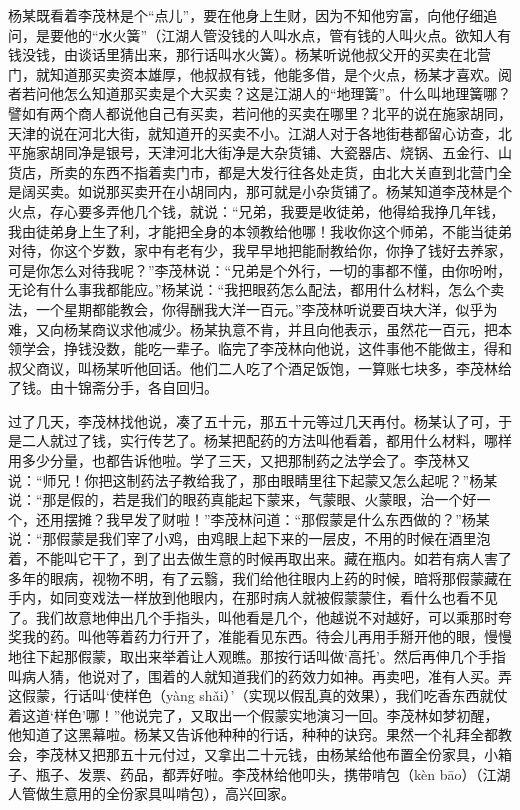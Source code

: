 \documentclass[12pt,UTF8]{ctexbook}
\begin{document}
杨某既看着李茂林是个“点儿”，要在他身上生财，因为不知他穷富，向他仔细追问，是要他的“水火簧”（江湖人管没钱的人叫水点，管有钱的人叫火点。欲知人有钱没钱，由谈话里猜出来，那行话叫水火簧）。杨某听说他叔父开的买卖在北营门，就知道那买卖资本雄厚，他叔叔有钱，他能多借，是个火点，杨某才喜欢。阅者若问他怎么知道那买卖是个大买卖？这是江湖人的“地理簧”。什么叫地理簧哪？譬如有两个商人都说他自己有买卖，若问他的买卖在哪里？北平的说在施家胡同，天津的说在河北大街，就知道开的买卖不小。江湖人对于各地街巷都留心访查，北平施家胡同净是银号，天津河北大街净是大杂货铺、大瓷器店、烧锅、五金行、山货店，所卖的东西不指着卖门市，都是大发行往各处走货，由北大关直到北营门全是阔买卖。如说那买卖开在小胡同内，那可就是小杂货铺了。杨某知道李茂林是个火点，存心要多弄他几个钱，就说：“兄弟，我要是收徒弟，他得给我挣几年钱，我由徒弟身上生了利，才能把全身的本领教给他哪！我收你这个师弟，不能当徒弟对待，你这个岁数，家中有老有少，我早早地把能耐教给你，你挣了钱好去养家，可是你怎么对待我呢？”李茂林说：“兄弟是个外行，一切的事都不懂，由你吩咐，无论有什么事我都能应。”杨某说：“我把眼药怎么配法，都用什么材料，怎么个卖法，一个星期都能教会，你得酬我大洋一百元。”李茂林听说要百块大洋，似乎为难，又向杨某商议求他减少。杨某执意不肯，并且向他表示，虽然花一百元，把本领学会，挣钱没数，能吃一辈子。临完了李茂林向他说，这件事他不能做主，得和叔父商议，叫杨某听他回话。他们二人吃了个酒足饭饱，一算账七块多，李茂林给了钱。由十锦斋分手，各自回归。

过了几天，李茂林找他说，凑了五十元，那五十元等过几天再付。杨某认了可，于是二人就过了钱，实行传艺了。杨某把配药的方法叫他看着，都用什么材料，哪样用多少分量，也都告诉他啦。学了三天，又把那制药之法学会了。李茂林又说：“师兄！你把这制药法子教给我了，那由眼睛里往下起蒙又怎么起呢？”杨某说：“那是假的，若是我们的眼药真能起下蒙来，气蒙眼、火蒙眼，治一个好一个，还用摆摊？我早发了财啦！”李茂林问道：“那假蒙是什么东西做的？”杨某说：“那假蒙是我们宰了小鸡，由鸡眼上起下来的一层皮，不用的时候在酒里泡着，不能叫它干了，到了出去做生意的时候再取出来。藏在瓶内。如若有病人害了多年的眼病，视物不明，有了云翳，我们给他往眼内上药的时候，暗将那假蒙藏在手内，如同变戏法一样放到他眼内，在那时病人就被假蒙蒙住，看什么也看不见了。我们故意地伸出几个手指头，叫他看是几个，他越说不对越好，可以乘那时夸奖我的药。叫他等着药力行开了，准能看见东西。待会儿再用手掰开他的眼，慢慢地往下起那假蒙，取出来举着让人观瞧。那按行话叫做‘高托’。然后再伸几个手指叫病人猜，他说对了，围着的人就知道我们的药效力如神。再卖吧，准有人买。弄这假蒙，行话叫‘使样色（yàng shǎi）’（实现以假乱真的效果），我们吃香东西就仗着这道‘样色’哪！”他说完了，又取出一个假蒙实地演习一回。李茂林如梦初醒，他知道了这黑幕啦。杨某又告诉他种种的行话，种种的诀窍。果然一个礼拜全都教会，李茂林又把那五十元付过，又拿出二十元钱，由杨某给他布置全份家具，小箱子、瓶子、发票、药品，都弄好啦。李茂林给他叩头，携带啃包（kèn bāo）（江湖人管做生意用的全份家具叫啃包），高兴回家。
\end{document}
